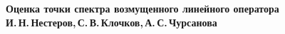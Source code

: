 \documentclass[10pt,a4paper,oneside]{article}
\begin{document}
 
\begin{center}
    \textbf{\LARGE Оценка точки спектра возмущенного линейного оператора} \\[1em]
    \textbf{И.\,Н.\,Нестеров,\,С.\,В.\,Клочков,\,А.\,С.\,Чурсанова} \\[2em]
\end{center}



\end{document}
